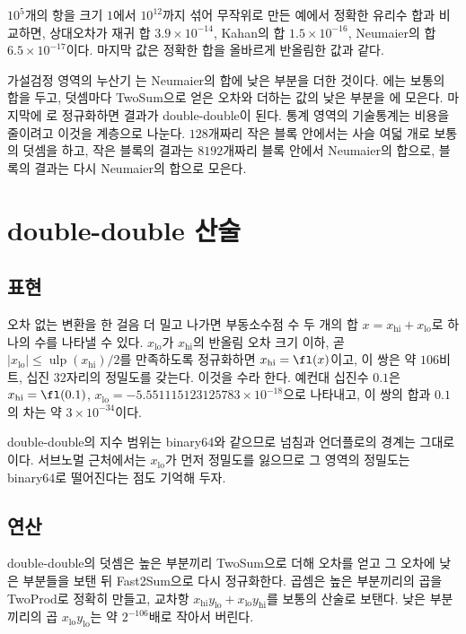 $10^5$개의 항을 크기 $1$에서 $10^{12}$까지 섞어 무작위로 만든 예에서 정확한 유리수 합과 비교하면, 상대오차가 재귀 합 $3.9\times10^{-14}$, Kahan의 합 $1.5\times10^{-16}$, Neumaier의 합 $6.5\times10^{-17}$이다. 마지막 값은 정확한 합을 올바르게 반올림한 값과 같다.

\begin{instardust}
가설검정 영역의 누산기 는 Neumaier의 합에 낮은 부분을 더한 것이다. 에는 보통의 합을 두고, 덧셈마다 TwoSum으로 얻은 오차와 더하는 값의 낮은 부분을 에 모은다. 마지막에 로 정규화하면 결과가 double-double이 된다. 통계 영역의 기술통계는 비용을 줄이려고 이것을 계층으로 나눈다. $128$개짜리 작은 블록 안에서는 사슬 여덟 개로 보통의 덧셈을 하고, 작은 블록의 결과는 $8192$개짜리 블록 안에서 Neumaier의 합으로, 블록의 결과는 다시 Neumaier의 합으로 모은다.
\end{instardust}

\section{double-double 산술}
\label{sec:double-double}

\subsection{표현}

오차 없는 변환을 한 걸음 더 밀고 나가면 부동소수점 수 두 개의 합 $x=x_{\mathrm{hi}}+x_{\mathrm{lo}}$로 하나의 수를 나타낼 수 있다. $x_{\mathrm{lo}}$가 $x_{\mathrm{hi}}$의 반올림 오차 크기 이하, 곧 $|x_{\mathrm{lo}}|\le\operatorname{ulp}(x_{\mathrm{hi}})/2$를 만족하도록 정규화하면 $x_{\mathrm{hi}}=\fl(x)$이고, 이 쌍은 약 $106$비트, 십진 $32$자리의 정밀도를 갖는다. 이것을  수라 한다. 예컨대 십진수 $0.1$은 $x_{\mathrm{hi}}=\fl(0.1)$, $x_{\mathrm{lo}}=-5.551115123125783\times10^{-18}$으로 나타내고, 이 쌍의 합과 $0.1$의 차는 약 $3\times10^{-34}$이다.

double-double의 지수 범위는 binary64와 같으므로 넘침과 언더플로의 경계는 그대로이다. 서브노멀 근처에서는 $x_{\mathrm{lo}}$가 먼저 정밀도를 잃으므로 그 영역의 정밀도는 binary64로 떨어진다는 점도 기억해 두자.

\subsection{연산}

double-double의 덧셈은 높은 부분끼리 TwoSum으로 더해 오차를 얻고 그 오차에 낮은 부분들을 보탠 뒤 Fast2Sum으로 다시 정규화한다. 곱셈은 높은 부분끼리의 곱을 TwoProd로 정확히 만들고, 교차항 $x_{\mathrm{hi}}y_{\mathrm{lo}}+x_{\mathrm{lo}}y_{\mathrm{hi}}$를 보통의 산술로 보탠다. 낮은 부분끼리의 곱 $x_{\mathrm{lo}}y_{\mathrm{lo}}$는 약 $2^{-106}$배로 작아서 버린다.

